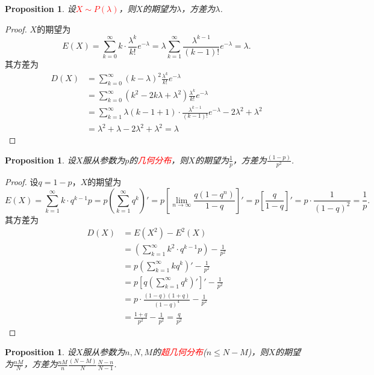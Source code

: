 \documentclass{article}
\newtheorem{proposition}[theorem]{Proposition}
\newcommand{\redt}[1]{\textcolor{red}{#1}}
\begin{document}
\begin{proposition}
\rm 设\redt{$X \sim P(\lambda)$}，则$X$的期望为$\lambda$，方差为$\lambda$.
\end{proposition}

\begin{proof}
$X$的期望为
$$
E(X) = \sum\limits_{k=0}^{\infty} k\cdot \frac{\lambda ^k}{k!}e^{-\lambda} =  \lambda \sum\limits_{k=1}^{\infty}  \frac{\lambda ^{k-1}}{(k-1)!}e^{-\lambda} = \lambda.
$$
其方差为
$$
\begin{array}{ll}
D(X) &= \sum\limits_{k=0}^{\infty} (k-\lambda)^2 \frac{\lambda ^k}{k!}e^{-\lambda} \\ 
&= \sum\limits_{k=0}^{\infty} (k^2 - 2k\lambda + \lambda^2) \frac{\lambda ^k}{k!}e^{-\lambda} \\ 
&= \sum\limits_{k=1}^{\infty} \lambda (k-1+1) \cdot \frac{\lambda ^{k-1}}{(k-1)!}e^{-\lambda}  - 2\lambda^2 +\lambda^2\\
&= \lambda^2 + \lambda - 2\lambda^2 + \lambda^2 = \lambda
\end{array}
$$
\end{proof}

\begin{proposition}
\rm 设$X$服从参数为$p$的\redt{几何分布}，则$X$的期望为$\frac{1}{p}$，方差为$\frac{(1-p)}{p^2}$.
\end{proposition}

\begin{proof}
设$q= 1- p$，$X$的期望为
$$
E(X) = \sum\limits_{k=1}^\infty k \cdot q^{k-1}p = p(\sum\limits_{k=1}^\infty q^{k})' = p \left[\lim\limits_{n \to \infty}\frac{q(1-q^n)}{1-q} \right]' = p\left[\frac{q}{1-q}\right]' = p \cdot \frac{1}{(1-q)^2} = \frac{1}{p}. 
$$
其方差为
$$
\begin{array}{ll}
D(X) &= E(X^2)-E^2(X) \\
&= \left(\sum\limits_{k=1}^\infty k^2 \cdot q^{k-1}p \right) -\frac{1}{p^2} \\
&= p\left(\sum\limits_{k=1}^{\infty} kq^k\right)' - \frac{1}{p^2} \\
&= p\left[ q \left(\sum\limits_{k=1}^{\infty} q^k \right)'\right]' -\frac{1}{p^2}\\
&= p \cdot \frac{(1-q)(1+q)}{(1-q)^4} - \frac{1}{p^2} \\
&= \frac{1+q}{p^2} - \frac{1}{p^2} = \frac{q}{p^2}
\end{array}
$$
\end{proof}

\begin{proposition}
\rm 设$X$服从参数为$n,N,M$的\redt{超几何分布}($n \leq N-M$)，则$X$的期望为$\frac{nM}{N}$，方差为$\frac{nM}{n} \frac{(N-M)}{N} \frac{N-n}{N-1}$. 
\end{proposition}
\end{document}

